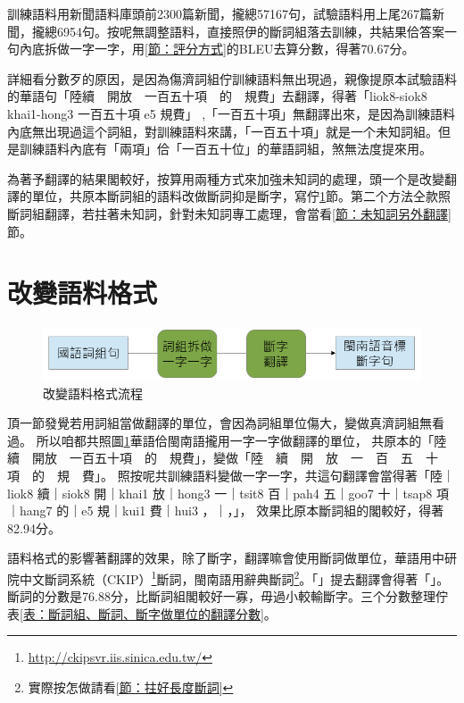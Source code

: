 \documentclass[final,oneside,onecolumn,12pt,a4paper]{book}%
\begin{document}
訓練語料用新聞語料庫頭前2300篇新聞，攏總57167句，試驗語料用上尾267篇新聞，攏總6954句。按呢無調整語料，直接照伊的斷詞組落去訓練，共結果佮答案一句內底拆做一字一字，用\ref{節：評分方式}的BLEU去算分數，得著70.67分。

詳細看分數歹的原因，是因為傷濟詞組佇訓練語料無出現過，親像提原本試驗語料的華語句「陸續　開放　一百五十項　的　規費」去翻譯，得著「liok8-siok8 khai1-hong3 一百五十項 e5 規費」 ,「一百五十項」無翻譯出來，是因為訓練語料內底無出現過這个詞組，對訓練語料來講，「一百五十項」就是一个未知詞組。但是訓練語料內底有「兩項」佮「一百五十位」的華語詞組，煞無法度提來用。

為著予翻譯的結果閣較好，按算用兩種方式來加強未知詞的處理，頭一个是改變翻譯的單位，共原本斷詞組的語料改做斷詞抑是斷字，寫佇\ref{節：改變語料格式}節。第二个方法仝款照斷詞組翻譯，若拄著未知詞，針對未知詞專工處理，會當看\ref{節：未知詞另外翻譯}節。



\section{改變語料格式}
\label{節：改變語料格式}

\begin{figure}
\centerline{\includegraphics[keepaspectratio,width=40em]{圖/改變語料格式}}
\caption{改變語料格式流程}
\label{改變語料格式}
\end{figure}

頂一節發覺若用詞組當做翻譯的單位，會因為詞組單位傷大，變做真濟詞組無看過。
所以咱都共照圖\ref{改變語料格式}華語佮閩南語攏用一字一字做翻譯的單位，
共原本的「陸續　開放　一百五十項　的　規費」，變做「陸　續　開　放　一　百　五　十　項　的　規　費」。
照按呢共訓練語料變做一字一字，共這句翻譯會當得著「陸｜liok8 續｜siok8 開｜khai1 放｜hong3 一｜tsit8 百｜pah4 五｜goo7 十｜tsap8 項｜hang7 的｜e5 規｜kui1 費｜hui3 ，｜，」，
效果比原本斷詞組的閣較好，得著82.94分。

語料格式的影響著翻譯的效果，除了斷字，翻譯嘛會使用斷詞做單位，華語用中研院中文斷詞系統（CKIP）\footnote{\url{http://ckipsvr.iis.sinica.edu.tw/}}斷詞，閩南語用辭典斷詞\footnote{實際按怎做請看\ref{節：拄好長度斷詞}}。「」提去翻譯會得著「」。斷詞的分數是76.88分，比斷詞組閣較好一寡，毋過小較輸斷字。三个分數整理佇表\ref{表：斷詞組、斷詞、斷字做單位的翻譯分數}。
\end{document}
